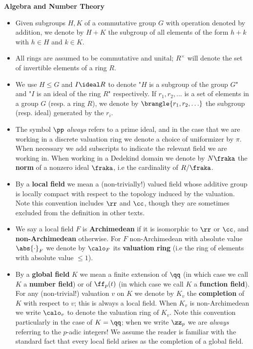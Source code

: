 \documentclass[11pt, x11names, openany]{book}
\begin{document}
\textbf{Algebra and Number Theory}
\begin{itemize}
    \item Given subgroups $H, K$ of a commutative group $G$ with operation denoted by addition, we denote by $H + K$ the subgroup of all elements of the form $h+k$ with $h \in H$ and $k \in K$. 
    \item All rings are assumed to be commutative and unital; $R^\times$ will denote the set of invertible elements of a ring $R$.
    \item We use $H \leq G$ and $I \ideal R$ to denote "$H$ is a subgroup of the group $G$" and "$I$ is an ideal of the ring $R$" respectively. If $r_1, r_2, \ldots$ is a set of elements in a group $G$ (resp. a ring $R$), we denote by $\brangle{r_1, r_2, \ldots}$ the subgroup (resp. ideal) generated by the $r_i$.
    \item The symbol $\pp$ \textit{always} refers to a prime ideal, and in the case that we are working in a discrete valuation ring we denote a choice of uniformizer by $\pi$. When necessary we add subscripts to indicate the relevant field we are working in. When working in a Dedekind domain we denote by $N\fraka$ the \textbf{norm} of a nonzero ideal $\fraka$, i.e the cardinality of $R/\fraka$.
    \item By a \textbf{local field} we mean a (non-trivially!) valued field whose additive group is locally compact with respect to the topology induced by the valuation. Note this convention includes $\rr$ and $\cc$, though they are sometimes excluded from the definition in other texts. 
    \item We say a local field $F$ is \textbf{Archimedean} if it is isomorphic to $\rr$ or $\cc$, and \textbf{non-Archimedean} otherwise. For $F$ non-Archimedean with absolute value $\abs{\cdot}_F$ we denote by $\calo_F$ its \textbf{valuation ring} (i.e the ring of elements with absolute value $\leq 1$).
    \item By a \textbf{global field} $K$ we mean a finite extension of $\qq$ (in which case we call $K$ a \textbf{number field}) or of $\ff_p(t)$ (in which case we call $K$ a \textbf{function field}). For any (non-trivial!) valuation $v$ on $K$ we denote by $K_v$ the \textbf{completion} of $K$ with respect to $v$; this is always a local field. When $K_v$ is non-Archimedean we write $\calo_v$ to denote the valuation ring of $K_v$. Note this convention particularly in the case of $K = \qq$; when we write $\zz_p$ we are \textit{always} referring to the $p$-adic integers! We assume the reader is familiar with the standard fact that every local field arises as the completion of a global field. 

\end{itemize}
\end{document}
